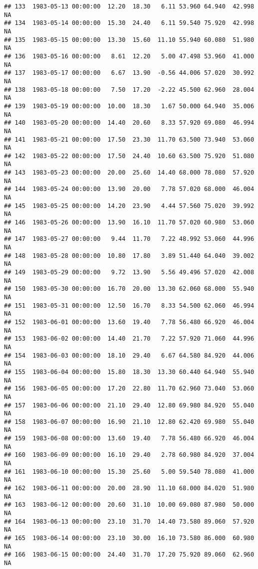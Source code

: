\documentclass{article}\usepackage{graphicx, color}
\makeatletter
\newenvironment{kframe}{%
 \def\at@end@of@kframe{}%
 \ifinner\ifhmode%
  \def\at@end@of@kframe{\end{minipage}}%
  \begin{minipage}{\columnwidth}%
 \fi\fi%
 \def\FrameCommand##1{\hskip\@totalleftmargin \hskip-\fboxsep
 \colorbox{shadecolor}{##1}\hskip-\fboxsep
     \hskip-\linewidth \hskip-\@totalleftmargin \hskip\columnwidth}%
 \MakeFramed {\advance\hsize-\width
   \@totalleftmargin\z@ \linewidth\hsize
   \@setminipage}}%
 {\par\unskip\endMakeFramed%
 \at@end@of@kframe}
\newenvironment{knitrout}{}{} %
\makeatother
\begin{document}
\begin{knitrout}
\begin{kframe}
\begin{verbatim}
## 133  1983-05-13 00:00:00  12.20  18.30   6.11 53.960 64.940  42.998     NA
## 134  1983-05-14 00:00:00  15.30  24.40   6.11 59.540 75.920  42.998     NA
## 135  1983-05-15 00:00:00  13.30  15.60  11.10 55.940 60.080  51.980     NA
## 136  1983-05-16 00:00:00   8.61  12.20   5.00 47.498 53.960  41.000     NA
## 137  1983-05-17 00:00:00   6.67  13.90  -0.56 44.006 57.020  30.992     NA
## 138  1983-05-18 00:00:00   7.50  17.20  -2.22 45.500 62.960  28.004     NA
## 139  1983-05-19 00:00:00  10.00  18.30   1.67 50.000 64.940  35.006     NA
## 140  1983-05-20 00:00:00  14.40  20.60   8.33 57.920 69.080  46.994     NA
## 141  1983-05-21 00:00:00  17.50  23.30  11.70 63.500 73.940  53.060     NA
## 142  1983-05-22 00:00:00  17.50  24.40  10.60 63.500 75.920  51.080     NA
## 143  1983-05-23 00:00:00  20.00  25.60  14.40 68.000 78.080  57.920     NA
## 144  1983-05-24 00:00:00  13.90  20.00   7.78 57.020 68.000  46.004     NA
## 145  1983-05-25 00:00:00  14.20  23.90   4.44 57.560 75.020  39.992     NA
## 146  1983-05-26 00:00:00  13.90  16.10  11.70 57.020 60.980  53.060     NA
## 147  1983-05-27 00:00:00   9.44  11.70   7.22 48.992 53.060  44.996     NA
## 148  1983-05-28 00:00:00  10.80  17.80   3.89 51.440 64.040  39.002     NA
## 149  1983-05-29 00:00:00   9.72  13.90   5.56 49.496 57.020  42.008     NA
## 150  1983-05-30 00:00:00  16.70  20.00  13.30 62.060 68.000  55.940     NA
## 151  1983-05-31 00:00:00  12.50  16.70   8.33 54.500 62.060  46.994     NA
## 152  1983-06-01 00:00:00  13.60  19.40   7.78 56.480 66.920  46.004     NA
## 153  1983-06-02 00:00:00  14.40  21.70   7.22 57.920 71.060  44.996     NA
## 154  1983-06-03 00:00:00  18.10  29.40   6.67 64.580 84.920  44.006     NA
## 155  1983-06-04 00:00:00  15.80  18.30  13.30 60.440 64.940  55.940     NA
## 156  1983-06-05 00:00:00  17.20  22.80  11.70 62.960 73.040  53.060     NA
## 157  1983-06-06 00:00:00  21.10  29.40  12.80 69.980 84.920  55.040     NA
## 158  1983-06-07 00:00:00  16.90  21.10  12.80 62.420 69.980  55.040     NA
## 159  1983-06-08 00:00:00  13.60  19.40   7.78 56.480 66.920  46.004     NA
## 160  1983-06-09 00:00:00  16.10  29.40   2.78 60.980 84.920  37.004     NA
## 161  1983-06-10 00:00:00  15.30  25.60   5.00 59.540 78.080  41.000     NA
## 162  1983-06-11 00:00:00  20.00  28.90  11.10 68.000 84.020  51.980     NA
## 163  1983-06-12 00:00:00  20.60  31.10  10.00 69.080 87.980  50.000     NA
## 164  1983-06-13 00:00:00  23.10  31.70  14.40 73.580 89.060  57.920     NA
## 165  1983-06-14 00:00:00  23.10  30.00  16.10 73.580 86.000  60.980     NA
## 166  1983-06-15 00:00:00  24.40  31.70  17.20 75.920 89.060  62.960     NA

\end{verbatim}
\end{kframe}
\end{knitrout}
\end{document}
